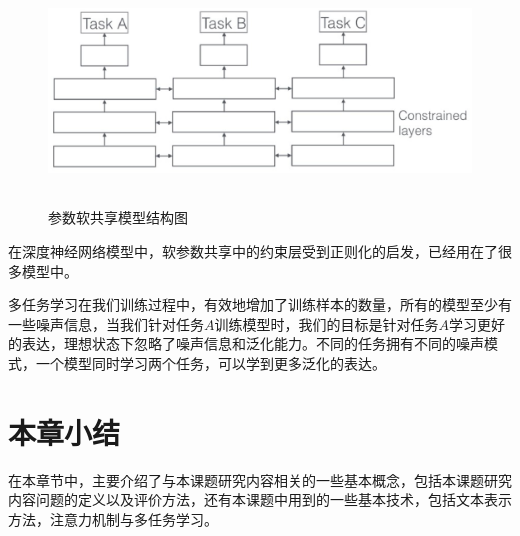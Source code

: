 \begin{figure}[htb]
    \centering
    \includegraphics[width=14cm,height=6cm, clip=true]{./sources/soft_share.eps}
    \vspace{-10pt}
    \caption{\label{fig:soft_share} 参数软共享模型结构图}
    \vspace{-5pt}
\end{figure}

在深度神经网络模型中，软参数共享中的约束层受到正则化的启发，已经用在了很多模型中。

多任务学习在我们训练过程中，有效地增加了训练样本的数量，所有的模型至少有一些噪声信息，当我们针对任务$A$训练模型时，我们的目标是针对任务$A$学习更好的表达，理想状态下忽略了噪声信息和泛化能力。不同的任务拥有不同的噪声模式，一个模型同时学习两个任务，可以学到更多泛化的表达。

\section{本章小结}
在本章节中，主要介绍了与本课题研究内容相关的一些基本概念，包括本课题研究内容问题的定义以及评价方法，还有本课题中用到的一些基本技术，包括文本表示方法，注意力机制与多任务学习。

